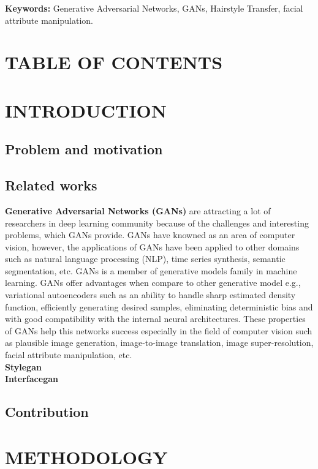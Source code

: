 \documentclass[12pt]{article}
\begin{document}
    \vspace*{2\baselineskip}
    \noindent
    \textbf{Keywords:} Generative Adversarial Networks, GANs, Hairstyle Transfer, facial attribute manipulation.
    \newpage
    \section*{\Large TABLE OF CONTENTS}
    \newpage
    \section{\Large INTRODUCTION}
    \subsection{\Large Problem and motivation}
    
    
    \subsection{\Large Related works}
    \textbf{Generative Adversarial Networks (GANs)} are attracting a lot of researchers in deep learning community because of the challenges and interesting problems, which GANs provide. GANs have knowned as an area of computer vision, however, the applications of GANs have been applied to other domains such as natural language processing (NLP), time series synthesis, semantic segmentation, etc. GANs is a member of generative models family in machine learning. GANs offer advantages when compare to other generative model e.g., variational autoencoders such as an ability to handle sharp estimated density function, efficiently generating desired samples, eliminating deterministic bias and with good compatibility with the internal neural architectures. These properties of GANs help this networks success especially in the field of computer vision such as plausible image generation, image-to-image translation,  image super-resolution, facial attribute manipulation, etc.
    \\
    
    \textbf{Stylegan}
    \\
    
    \textbf{Interfacegan}
    
    \subsection{\Large Contribution}
    
    \section{\Large METHODOLOGY}
\end{document}
